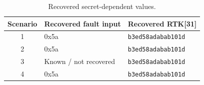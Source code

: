 \begin{table}[t]
\centering
\caption{Recovered secret-dependent values.}
\label{tab:recovered-values}
\small
\begin{tabular}{cll}
\toprule
Scenario & Recovered fault input & Recovered RTK[31] \\
\midrule
1 & 0x5a & \texttt{b3ed58adabab101d} \\
2 & 0x5a & \texttt{b3ed58adabab101d} \\
3 & Known / not recovered & \texttt{b3ed58adabab101d} \\
4 & 0x5a & \texttt{b3ed58adabab101d} \\
\bottomrule
\end{tabular}
\end{table}
